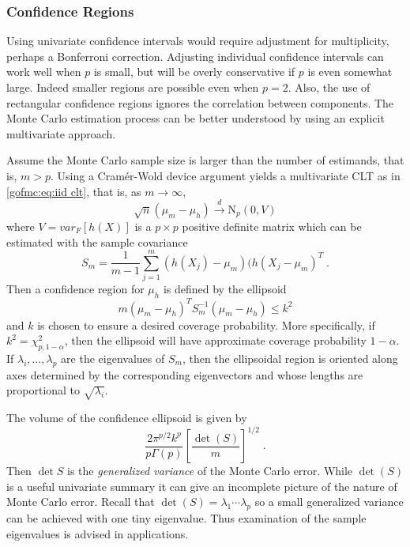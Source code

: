 \documentclass[12pt]{article}
\theoremstyle{plain}
\theoremstyle{definition}
\theoremstyle{remark}
\begin{document}
\subsubsection{Confidence Regions}
\label{gofmc:sec:multivariate confidence regions}
Using univariate confidence intervals would require adjustment for
multiplicity, perhaps a Bonferroni correction.  Adjusting individual
confidence intervals can work well when $p$ is small, but will be
overly conservative if $p$ is even somewhat large.  Indeed smaller
regions are possible even when $p=2$. Also, the use of rectangular
confidence regions ignores the correlation between components.  The
Monte Carlo estimation process can be better understood by using an
explicit multivariate approach.

Assume the Monte Carlo sample size is larger than the number of
estimands, that is, $m > p$.  Using a Cram{\' e}r-Wold device argument
yields a multivariate CLT as in \eqref{gofmc:eq:iid clt}, that is, as
$m \to \infty$,
\begin{equation}
\label{gofmc:eq:multi iid clt}
\sqrt{n}(\mu_m - \mu_h) \stackrel{d}{\to} \text{N}_{p}(0, V)
\end{equation}
where $V=var_{F}[h(X)]$ is a $p \times p$ positive definite matrix
which can be estimated with the sample covariance
\begin{equation*}
S_m = \frac{1}{m-1} \sum_{j=1}^{m} (h(X_{j}) - \mu_m)(h(X_{j} -
\mu_m)^{T} \; .
\end{equation*}
Then a confidence region for $\mu_h$ is defined by the ellipsoid
$$
m(\mu_m - \mu_h)^T S_m^{-1} (\mu_m - \mu_h) \le k^2
$$
and $k$ is chosen to ensure a desired coverage probability.  More
specifically, if $k^2 =\chi^2_{p, 1-\alpha}$, then the ellipsoid will
have approximate coverage probability $1-\alpha$. If
$\lambda_{i}, \ldots, \lambda_{p}$ are the eigenvalues of $S_m$, then
the ellipsoidal region is oriented along axes determined by the
corresponding eigenvectors and whose lengths are proportional to
$\sqrt{\lambda_{i}}$.

The volume of the confidence ellipsoid is given by
$$
\frac{2 \pi^{p/2} k^p}{p \Gamma(p)} \left[ \frac{\det(S)}{m}
\right]^{1/2}\; . 
$$
Then $\det{S}$ is the \textit{generalized variance} of the Monte Carlo
error. While $\det(S)$ is a useful univariate summary it can give an
incomplete picture of the nature of Monte Carlo error.  Recall that
$\det(S)=\lambda_1 \cdots \lambda_p$ so a small generalized variance
can be achieved with one tiny eigenvalue. Thus examination of the
sample eigenvalues is advised in applications.
\end{document}
